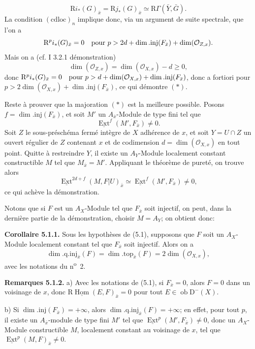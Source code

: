 \documentclass[11pt]{article}
\DeclareMathOperator{\Hom}{Hom}
\DeclareMathOperator{\Ext}{Ext}
\newcommand{\R}{\mathrm{R}}\newcommand{\RHomCore}{\mathrm{RHom}}
\newcommand{\D}{\mathrm{D}}
\newcommand{\ob}{\operatorname{ob}}
\providecommand{\Hom}{\operatorname{Hom}}
\providecommand{\ob}{\operatorname{ob}}
\providecommand{\R}{\mathrm R}
\providecommand{\Hom}{\operatorname{Hom}}
\begin{document}
\[
        \R i_*(G)_{\bar{x}}=\R j_*(G)_{\bar{x}}\simeq \R\Gamma(\bar{Y},\bar{G}).
\]
La condition $(\mathrm{cdloc})_n$ implique donc, via un argument de suite spectrale, que l'on a
\[
        \R^p i_*(G)_{\bar{x}}=0\quad\hbox{pour }p>2d+\dim.\mathrm{inj}(F_{\bar{x}})+\dim(\mathcal{O}_{Z,x}).
\]
Mais on a (cf. I 3.2.1 démonstration)
\[
        \dim(\mathcal{O}_{Z,x})=\dim(\mathcal{O}_{X,x})-d\geq0,
\]
donc $\mathrm{R}^p i_*(G)_{\bar{x}}=0\quad\hbox{pour }p>d+\dim(\mathcal{O}_{X,x})+\dim.\mathrm{inj}(F_{\bar{x}})$,
donc a fortiori pour $p>2\dim(\mathcal{O}_{X,x})+\dim.\mathrm{inj}(F_{\bar{x}})$, ce qui démontre $(*)$.

Reste à prouver que la majoration $(*)$ est la meilleure possible. Posons $f=\dim.\mathrm{inj}(F_{\bar{x}})$, et soit $M'$ un $A_{\bar{x}}$-Module de type fini tel que
\[
        \underline{\Ext}^f(M',F_{\bar{x}})\neq0.
\]
Soit $Z$ le sous-préschéma fermé intègre de $X$ adhérence de $x$, et soit $Y=U\cap Z$ un ouvert régulier de $Z$ contenant $x$ et de codimension $d=\dim(\mathcal{O}_{X,x})$ en tout point. Quitte à restreindre $Y$, il existe un $A_Y$-Module localement constant constructible $M$ tel que $M_{\bar{x}}=M'$. Appliquant le théorème de pureté, on trouve alors
\[
        \underline{\Ext}^{2d+f}(M,F|U)_{\bar{x}}\simeq \underline{\Ext}^f(M',F_{\bar{x}})\neq0,
\]
ce qui achève la démonstration.

Notons que si $F$ est un $A_X$-Module tel que $F_{\bar{x}}$ soit injectif, on peut, dans la dernière partie de la démonstration, choisir $M=A_Y$; on obtient donc:

\textbf{Corollaire 5.1.1.} Sous les hypothèses de (5.1), supposons que $F$ soit un $A_X$-Module localement constant tel que $F_{\bar{x}}$ soit injectif. Alors on a
\[
        \dim.\mathrm{q.inj}_{\bar{x}}(F)=\dim.\mathrm{top}_{\bar{x}}(F)=2\dim(\mathcal{O}_{X,x}),
\]
avec les notations du n\textsuperscript{o}~2.

\textbf{Remarques 5.1.2.} a) Avec les notations de (5.1), si $F_{\bar{x}}=0$, alors $F=0$ dans un voisinage de $x$, donc $\R\underline{\Hom}(E,F)_{\bar{x}}=0$ pour tout $E\in\ob\D^{-}(X)$.

b) Si $\dim.\mathrm{inj}(F_{\bar{x}})=+\infty$, alors $\dim.\mathrm{q.inj}_{\bar{x}}(F)=+\infty$; en effet, pour tout $p$, il existe un $A_{\bar{x}}$-module de type fini $M'$ tel que $\underline{\Ext}^p(M',F_{\bar{x}})\neq0$, donc un $A_X$-Module constructible $M$, localement constant au voisinage de $x$, tel que $\underline{\Ext}^p(M,F)_{\bar{x}}\neq0$.
\end{document}
